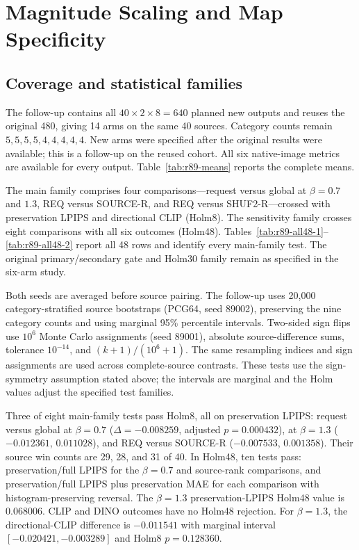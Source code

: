 \documentclass[10pt,doubleanonymous]{ieeeconf}
\begin{document}
\section{Magnitude Scaling and Map Specificity}
\label{sec:extension}
\subsection{Coverage and statistical families}
The follow-up contains all $40\times2\times8=640$ planned new outputs and reuses the original 480, giving 14 arms on the same 40 sources. Category counts remain $5,5,5,5,4,4,4,4,4$. New arms were specified after the original results were available; this is a follow-up on the reused cohort. All six native-image metrics are available for every output. Table~\ref{tab:r89-means} reports the complete means.



The main family comprises four comparisons---request versus global at $\beta=0.7$ and $1.3$, REQ versus SOURCE-R, and REQ versus SHUF2-R---crossed with preservation LPIPS and directional CLIP (Holm8). The sensitivity family crosses eight comparisons with all six outcomes (Holm48). Tables~\ref{tab:r89-all48-1}--\ref{tab:r89-all48-2} report all 48 rows and identify every main-family test. The original primary/secondary gate and Holm30 family remain as specified in the six-arm study.

Both seeds are averaged before source pairing. The follow-up uses 20,000 category-stratified source bootstraps (PCG64, seed 89002), preserving the nine category counts and using marginal 95\% percentile intervals. Two-sided sign flips use $10^6$ Monte Carlo assignments (seed 89001), absolute source-difference sums, tolerance $10^{-14}$, and $(k+1)/(10^6+1)$. The same resampling indices and sign assignments are used across complete-source contrasts. These tests use the sign-symmetry assumption stated above; the intervals are marginal and the Holm values adjust the specified test families.




Three of eight main-family tests pass Holm8, all on preservation LPIPS: request versus global at $\beta=0.7$ ($\Delta=-0.008259$, adjusted $p=0.000432$), at $\beta=1.3$ ($-0.012361$, $0.011028$), and REQ versus SOURCE-R ($-0.007533$, $0.001358$). Their source win counts are 29, 28, and 31 of 40. In Holm48, ten tests pass: preservation/full LPIPS for the $\beta=0.7$ and source-rank comparisons, and preservation/full LPIPS plus preservation MAE for each comparison with histogram-preserving reversal. The $\beta=1.3$ preservation-LPIPS Holm48 value is 0.068006. CLIP and DINO outcomes have no Holm48 rejection. For $\beta=1.3$, the directional-CLIP difference is $-0.011541$ with marginal interval $[-0.020421,-0.003289]$ and Holm8 $p=0.128360$.
\end{document}
